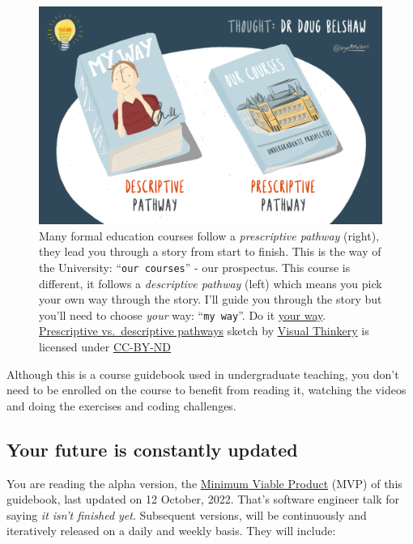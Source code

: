 \documentclass[
]{book}
\begin{document}
\begin{figure}

{\centering \includegraphics[width=1\linewidth]{images/prescriptive-vs-descriptive-pathways} 

}

\caption{Many formal education courses follow a \emph{prescriptive pathway} (right), they lead you through a story from start to finish. This is the way of the University: ``\texttt{our\ courses}'' - our prospectus. This course is different, it follows a \emph{descriptive pathway} (left) which means you pick your own way through the story. I'll guide you through the story but you'll need to choose \emph{your} way: ``\texttt{my\ way}''. Do it \href{https://en.wikipedia.org/wiki/My_Way}{your way}. \citep{sinatra} \href{https://bryanmmathers.com/prescriptive-vs-descriptive-pathways/}{Prescriptive vs.~descriptive pathways} sketch by \href{https://visualthinkery.com/}{Visual Thinkery} is licensed under \href{https://creativecommons.org/licenses/by-nd/4.0/}{CC-BY-ND}}\label{fig:descriptive-fig}
\end{figure}



Although this is a course guidebook used in undergraduate teaching, you don't need to be enrolled on the course to benefit from reading it, watching the videos and doing the exercises and coding challenges.

\hypertarget{version}{%
\subsection{Your future is constantly updated}\label{version}}

You are reading the alpha version, the \href{https://en.wikipedia.org/wiki/Minimum_viable_product}{Minimum Viable Product} (MVP) of this guidebook, last updated on 12 October, 2022. That's software engineer talk for saying \emph{it isn't finished yet}. Subsequent versions, will be continuously and iteratively released on a daily and weekly basis. They will include:
\end{document}
